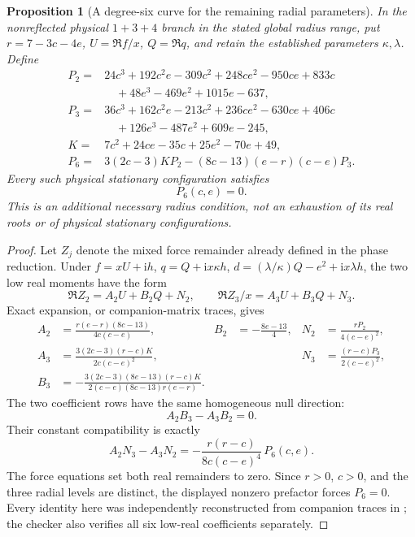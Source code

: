 \documentclass[11pt,a4paper]{article}
\newtheorem{proposition}[theorem]{Proposition}
\theoremstyle{remark}
\begin{document}
\begin{proposition}[A degree-six curve for the remaining radial parameters]
\label{prop:eight-134-new-real-radius-curve}
In the nonreflected physical $1+3+4$ branch in the stated global
radius range, put $r=7-3c-4e$, $U=\Re f/x$, $Q=\Re q$, and retain
the established parameters $\kappa,\lambda$.
Define
\begin{align*}
 P_2={}&24c^3+192c^2e-309c^2+248ce^2-950ce+833c\\
       &\quad+48e^3-469e^2+1015e-637,\\
 P_3={}&36c^3+162c^2e-213c^2+236ce^2-630ce+406c\\
       &\quad+126e^3-487e^2+609e-245,\\
 K={}&7c^2+24ce-35c+25e^2-70e+49,\\
 P_6={}&3(2c-3)KP_2-(8c-13)(e-r)(c-e)P_3.
\end{align*}
Every such physical stationary configuration satisfies
\[
                         P_6(c,e)=0.
\]
This is an additional necessary radius condition, not an exhaustion
of its real roots or of physical stationary configurations.
\end{proposition}
\begin{proof}
Let $Z_j$ denote the mixed force remainder already defined in the
phase reduction. Under $f=xU+\mathrm ih$, $q=Q+\mathrm ix\kappa h$,
$d=(\lambda/\kappa)Q-e^2+\mathrm ix\lambda h$, the two low real
moments have the form
\[
 \Re Z_2=A_2U+B_2Q+N_2,\qquad
 \Re Z_3/x=A_3U+B_3Q+N_3.
\]
Exact expansion, or companion-matrix traces, gives
\begin{align*}
 A_2&=\frac{r(e-r)(8c-13)}{4c(c-e)},&
 B_2&=-\frac{8e-13}{4},&
 N_2&=\frac{rP_2}{4(c-e)^2},\\
 A_3&=\frac{3(2c-3)(r-c)K}{2c(c-e)^2},&&&
 N_3&=\frac{(r-c)P_3}{2(c-e)^2},\\
 B_3&=-\frac{3(2c-3)(8e-13)(r-c)K}
               {2(c-e)(8c-13)r(e-r)}.
\end{align*}
The two coefficient rows have the same homogeneous null direction:
\[
 A_2B_3-A_3B_2=0.
\]
Their constant compatibility is exactly
\[
 A_2N_3-A_3N_2
       =-\frac{r(r-c)}{8c(c-e)^4}\,P_6(c,e).
\]
The force equations set both real remainders to zero. Since
$r>0$, $c>0$, and the three radial levels are distinct, the
displayed nonzero prefactor forces $P_6=0$.
Every identity here was independently reconstructed from companion
traces in ; the checker also verifies
all six low-real coefficients separately.
\end{proof}
\end{document}
